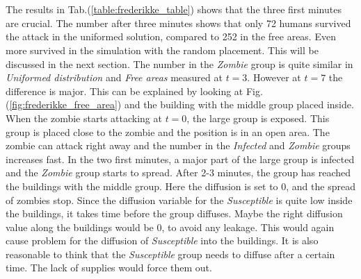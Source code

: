 \documentclass[%
twoside,                 %
final,                   %
chapterprefix=true,      %
open=right               %
10pt]{book}
\begin{document}
\\
\\
The results in Tab.(\ref{table:frederikke_table}) shows that the three first minutes are crucial. The number after three minutes shows that only 72 humans survived the attack in the uniformed solution, compared to 252 in the free areas. Even more survived in the simulation with the random placement. This will be discussed in the next section. The number in the \emph{Zombie} group is quite similar in \emph{Uniformed distribution} and \emph{Free areas} measured at $t=3$. However at $t=7$ the difference is major. This can be explained by looking at Fig.(\ref{fig:frederikke_free_area}) and the building with the middle group placed inside. When the zombie starts attacking at $t=0$, the large group is exposed. This group is placed close to the zombie and the position is in an open area. The zombie can attack right away and the number in the \emph{Infected} and \emph{Zombie} groups increases fast. In the two first minutes, a major part of the large group is infected and the \emph{Zombie} group starts to spread. After 2-3 minutes, the group has reached the buildings with the middle group. Here the diffusion is set to 0, and the spread of zombies stop. Since the diffusion variable for the \emph{Susceptible} is quite low inside the buildings, it takes time before the group diffuses. Maybe the right diffusion value along the buildings would be 0, to avoid any leakage. This would again cause problem for the diffusion of \emph{Susceptible} into the buildings. It is also reasonable to think that the \emph{Susceptible} group needs to diffuse after a certain time. The lack of supplies would force them out.




\label{table:frederikke_table}
\end{document}
